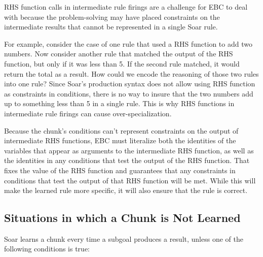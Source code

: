 RHS function calls in intermediate rule firings are a challenge for EBC to deal with because the problem-solving may have placed constraints on the intermediate results that cannot be represented in a single Soar rule.  

For example, consider the case of one rule that used a RHS function to add two numbers.  Now consider another rule that matched the output of the RHS function, but only if it was less than 5.  If the second rule matched, it would return the total as a result.  How could we encode the reasoning of those two rules into one rule?  Since Soar's production syntax does not allow using RHS function as constraints in conditions, there is no way to insure that the two numbers add up to something less than 5 in a single rule.  This is why RHS functions in intermediate rule firings can cause over-specialization.  

Because the chunk's conditions can't represent constraints on the output of intermediate RHS functions, EBC must literalize both the identities of the variables that appear as arguments to the intermediate RHS function, as well as the identities in any conditions that test the output of the RHS function.  That fixes the value of the RHS function and guarantees that any constraints in conditions that test the output of that RHS function will be met.  While this will make the learned rule more specific, it will also ensure that the rule is correct.

\subsection{Situations in which a Chunk is Not Learned}

Soar learns a chunk every time a subgoal produces a result, unless one of the following conditions is true:

